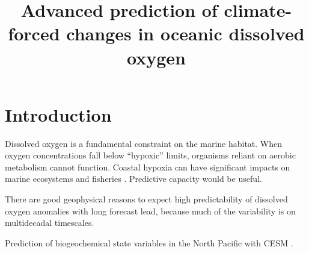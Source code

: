 \documentclass[linenumbers,draft]{agujournal}
\begin{document}
\title{Advanced prediction of climate-forced changes in oceanic dissolved oxygen}




\begin{keypoints}
\item
\item
\item
\end{keypoints}


\begin{abstract}

\end{abstract}


\section{Introduction}

Dissolved oxygen is a fundamental constraint on the marine habitat.
When oxygen concentrations fall below ``hypoxic'' limits, organisms reliant on aerobic metabolism cannot function.
Coastal hypoxia can have significant impacts on marine ecosystems and fisheries \citep{Rabalais-Diaz-etal-2010}.
Predictive capacity would be useful.

There are good geophysical reasons to expect high predictability of dissolved oxygen anomalies with long forecast lead, because much of the variability is on multidecadal timescales.


Prediction of biogeochemical state variables in the North Pacific with CESM \citep{Chikamoto-Timmermann-etal-2015}.
\end{document}
